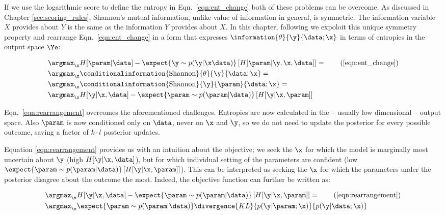 If we use the logarithmic score to define the entropy in Eqn.\ \eqref{eqn:ent_change} both of these problems can be overcome. As discussed in Chapter \ref{sec:scoring_rules}, Shannon's mutual information, unlike value of information in general, is symmetric. The information variable $X$ provides about $Y$ is the same as the information $Y$ provides about $X$. In this chapter, following \citep{ExactInformation} we expoloit this unique symmetry property and rearrange Eqn.\ \eqref{eqn:ent_change} in a form that expresses $\information{\theta}{\y}{\data;\x}$ in terms of entropies in the output space $\Ye$:

\begin{align}
	&\argmax_{\x} H[\param | \data] - \expect{\y\sim p(\y|\x\data)} \left[ H[\param| \y, \x,\data] \right] = \tag{\ref{eqn:ent_change}}\\
	&\argmax_{\x} \conditionalinformation{\mbox{Shannon}}{\theta}{\y}{\data;\x} =\\
	&\argmax_{\x} \conditionalinformation{\mbox{Shannon}}{\y}{\param}{\data;\x} =\\
	&\argmax_{\x} H[\y \vert \x, \data] - \expect{\param\sim p(\param|\data)} \left[ H[\y \vert \x,\param] \right] \label{eqn:rearrangement} 
\end{align}

Eqn.\ \eqref{eqn:rearrangement} overcomes the aforementioned challenges. Entropies are now calculated in the -- usually low dimensional -- output space. Also $\param$ is now conditioned only on $\data$, never on $\x$ and $\y$, so we do not need to update the posterior for every possible outcome, saving a factor of $k\cdot l$ posterior updates.

Equation \eqref{eqn:rearrangement} provides us with an intuition about the objective; we seek the $\x$ for which the model is marginally most uncertain about $\y$ (high $H[\y \vert \x, \data]$), but for which individual setting of the parameters are confident (low $\expect{\param\sim p(\param|\data)} \left[ H[\y \vert \x,\param] \right]$). This can be interpreted as seeking the $\x$ for which the parameters under the posterior disagree about the outcome the most. Indeed, the objective function can further be written as:

\begin{align}
	&\argmax_{\x} H[\y \vert \x, \data] - \expect{\param\sim p(\param|\data)} \left[ H[\y \vert \x,\param] \right] = \tag{\ref{eqn:rearrangement}}\\
	&\argmax_{\x} \expect{\param\sim p(\param|\data)}  \divergence{KL}{p(\y\vert\param;\x)}{p(\y\vert\data;\x)}
\end{align}

